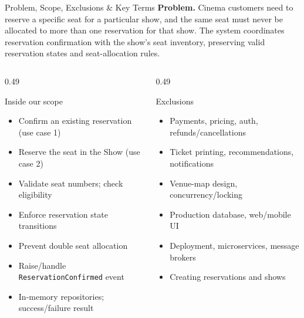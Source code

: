 \documentclass[aspectratio=169,11pt]{beamer}
\newcommand{\code}[1]{\texttt{#1}}
\begin{document}
\begin{frame}{Problem, Scope, Exclusions \& Key Terms}
  \textbf{Problem.} Cinema customers need to reserve a specific seat for a
  particular show, and the same seat must never be allocated to more than one
  reservation for that show. The system coordinates reservation confirmation
  with the show's seat inventory, preserving valid reservation states and
  seat-allocation rules.

  \begin{columns}[t]
    \begin{column}{0.49\textwidth}
      \begin{block}{Inside our scope}
        \footnotesize
        \begin{itemize}
          \item Confirm an existing reservation (use case 1)
          \item Reserve the seat in the Show (use case 2)
          \item Validate seat numbers; check eligibility
          \item Enforce reservation state transitions
          \item Prevent double seat allocation
          \item Raise/handle \code{ReservationConfirmed} event
          \item In-memory repositories; success/failure result
        \end{itemize}
      \end{block}
    \end{column}
    \begin{column}{0.49\textwidth}
      \begin{block}{Exclusions}
        \footnotesize
        \begin{itemize}
          \item Payments, pricing, auth, refunds/cancellations
          \item Ticket printing, recommendations, notifications
          \item Venue-map design, concurrency/locking
          \item Production database, web/mobile UI
          \item Deployment, microservices, message brokers
          \item Creating reservations and shows
        \end{itemize}
      \end{block}
    \end{column}
  \end{columns}


\end{frame}
\end{document}
